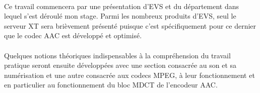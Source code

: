\documentclass{article}
\begin{document}
    \paragraph{}


    \paragraph{}
    Ce travail commencera par une présentation d'EVS et du département dans lequel s'est déroulé mon stage. Parmi les nombreux produits d'EVS, seul le serveur XT sera brièvement présenté puisque c'est spécifiquement pour ce dernier que le codec AAC est développé et optimisé.

    \paragraph{}
    Quelques notions théoriques indispensables à la compréhension du travail pratique seront ensuite développées avec une section consacrée au son et sa numérisation et une autre consacrée aux codecs MPEG, à leur fonctionnement et en particulier au fonctionnement du bloc MDCT de l'encodeur AAC.



\end{document}
